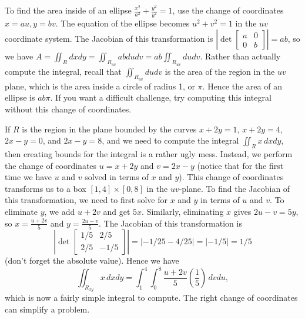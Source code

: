 \begin{example}
To find the area inside of an ellipse
$\frac{x^2}{a^2}+\frac{y^2}{b^2}=1$, use the change of coordinates
$x=au,y=bv$.  The equation of the ellipse becomes $u^2+v^2=1$ in the
$uv$ coordinate system.  The Jacobian of this transformation is
$\left|\det \begin{bmatrix} a&0\\0&b\end{bmatrix}\right|=ab$, so we
have $A = \iint_R dxdy = \iint_{R_{uv}}abdudv = ab\iint_{R_{uv}}dudv$. 
Rather than actually compute the integral, recall that 
$\iint_{R_{uv}}dudv$ is the area of the region in the $uv$ plane,
which is the area inside a circle of radius 1, or $\pi$. Hence the area
of an ellipse is $ab\pi$. If you want a difficult challenge, try
computing this integral without this change of coordinates. 
\end{example}

\begin{example}
%
If $R$ is the region in the plane bounded by the curves $x+2y=1$,
$x+2y=4$, $2x-y=0$, and $2x-y=8$, and we need to compute the integral
$\iint_R x\,dxdy$, then creating bounds for the integral is a rather
ugly mess.  Instead, we perform the change of coordinates $u=x+2y$ and
$v=2x-y$ (notice that for the first time we have $u$ and $v$ solved in
terms of $x$ and $y$). This change of coordinates transforms us to a
box $[1,4]\times [0,8]$ in the $uv$-plane.  To find the Jacobian of this
transformation, we need to first solve for $x$ and $y$ in terms of $u$
and $v$.  To eliminate $y$, we add $u+2v$ and get $5x$. Similarly,
eliminating $x$ gives $2u-v=5y$, so $x=\frac{u+2v}{5}$ and
$y=\frac{2u-v}{5}$.  The Jacobian of this transformation is
$$\left|\det \begin{bmatrix}
    1/5&2/5\\2/5&-1/5\end{bmatrix}\right|=\left|-1/25-4/25\right|=\left|-1/5\right|=1/5$$
(don't forget the absolute value).  Hence we have $$\iint_{R_{xy}}x\,dxdy
= \int_1^4\int_0^8\frac{u+2v}{5}\left(\frac{1}{5}\right)\,dvdu,$$ which is now
a fairly simple integral to compute.  The right change of coordinates
can simplify a problem.
\end{example}

